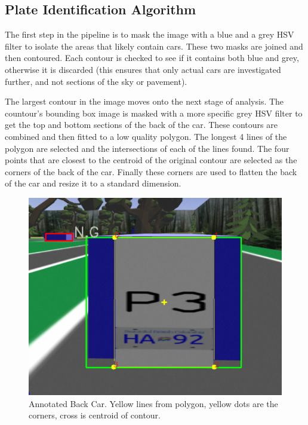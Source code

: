 \documentclass[titlepage, twocolumn]{article}
\begin{document}
\subsection{Plate Identification Algorithm}

The first step in the pipeline is to mask the image with a blue and a grey HSV filter to isolate the areas that likely contain cars. These two masks are joined and then contoured. Each contour is checked to see if it contains both blue and grey, otherwise it is discarded (this ensures that only actual cars are investigated further, and not sections of the sky or pavement). 

The largest contour in the image moves onto the next stage of analysis. The countour's bounding box image is masked with a more specific grey HSV filter to get the top and bottom sections of the back of the car. These contours are combined and then fitted to a low quality polygon. The longest 4 lines of the polygon are selected and the intersections of each of the lines found. The four points that are closest to the centroid of the original contour are selected as the corners of the back of the car. Finally these corners are used to flatten the back of the car and resize it to a standard dimension.

\begin{figure}[H]
\centering
\includegraphics[width=\linewidth]{Annotated back car.png}
\caption{Annotated Back Car. Yellow lines from polygon, yellow dots are the corners, cross is centroid of contour.}
\label{fig:annotatedbackcar}
\end{figure}
\end{document}

